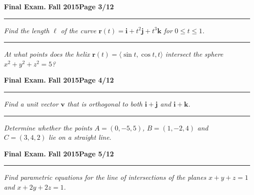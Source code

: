 \documentclass[12pt]{article}
\begin{document}
\hfill{\large\bf Final Exam.}\hfill{\large\bf
  Fall 2015}\hfill{\large\bf Page 3/12}\hrule

\bigskip
{\problem[5 pts] \em Find the length $\ell$ of the curve $\boldsymbol{r}(t) =
\boldsymbol{i} + t^2 \boldsymbol{j} + t^3 \boldsymbol{k}$ for $0 \leq t \leq
1$.} 
\vspace{9.5cm}
\begin{flushright}
\end{flushright}
\hrule
{\problem[5 pts] \em At what points does the helix $\boldsymbol{r}(t) = \langle \sin t, \cos t, t \rangle$ intersect the sphere $x^2+y^2+z^2=5$?}
\vspace{7.5cm}
\begin{flushright}
\end{flushright}
\newpage

\hfill{\large\bf Final Exam.}\hfill{\large\bf
  Fall 2015}\hfill{\large\bf Page 4/12}\hrule

\bigskip
{\problem[5 pts] \em Find a unit vector $\boldsymbol{v}$ that is orthogonal
to both $\boldsymbol{i} + \boldsymbol{j}$ and $\boldsymbol{i} +
\boldsymbol{k}$.} 
\vspace{11cm}
\begin{flushright}
\end{flushright}
\hrule
{\problem[5 pts] \em Determine whether the points $A=(0,-5,5)$, $ B=
(1,-2,4)$ and $C=(3,4,2)$ lie on a straight line.}
\newpage

\hfill{\large\bf Final Exam.}\hfill{\large\bf
  Fall 2015}\hfill{\large\bf Page 5/12}\hrule

\bigskip
{\problem[5 pts] \em Find parametric equations for the line of intersections
of the planes $x+y+z=1$ and $x+2y+2z=1$.}
\vspace{18.5cm}
\begin{flushright}
\end{flushright}
\end{document}
